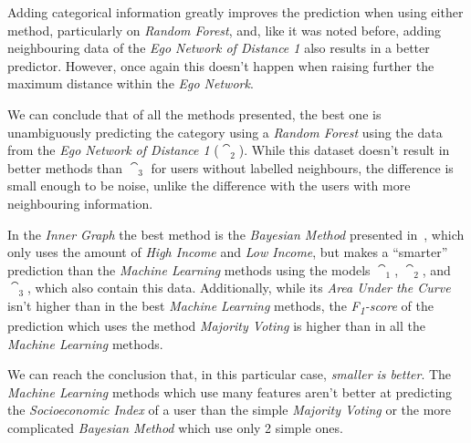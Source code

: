 Adding categorical information greatly improves the prediction when using either method, particularly on \emph{Random Forest}, and, like it was noted before, adding neighbouring data of the \emph{Ego Network of Distance 1} also results in a better predictor. However, once again this doesn't happen when raising further the maximum distance within the \emph{Ego Network}.

We can conclude that of all the methods presented, the best one is unambiguously predicting the category using a \emph{Random Forest} using the data from the \emph{Ego Network of Distance 1} ($\cat_2$). While this dataset doesn't result in better methods than $\cat_3$ for users without labelled neighbours, the difference is small enough to be noise, unlike the difference with the users with more neighbouring information.

In the \emph{Inner Graph} the best method is the \emph{Bayesian Method} presented in~\cite{fixmanasonam2016}, which only uses the amount of \emph{High Income} and \emph{Low Income}, but makes a ``smarter'' prediction than the \emph{Machine Learning} methods using the models $\cat_1$, $\cat_2$, and $\cat_3$, which also contain this data. Additionally, while its \emph{Area Under the Curve} isn't higher than in the best \emph{Machine Learning} methods, the \emph{F\textsubscript{1}-score} of the prediction which uses the method \emph{Majority Voting} is higher than in all the \emph{Machine Learning} methods.

We can reach the conclusion that, in this particular case, \emph{smaller is better}. The \emph{Machine Learning} methods which use many features\footnotemark{} aren't better at predicting the \emph{Socioeconomic Index} of a user than the simple \emph{Majority Voting} or the more complicated \emph{Bayesian Method} which use only 2 simple ones.

